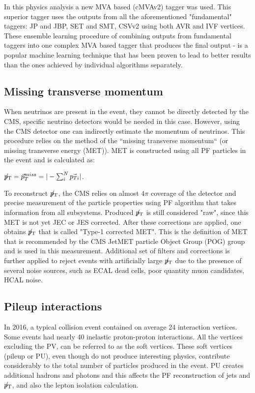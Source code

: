 \begin{small}
In this physics analysis a new MVA based (cMVAv2) tagger was used. This superior tagger uses the outputs from all the aforementioned "fundamental" taggers: JP and JBP, SET and SMT, CSVv2 using both AVR and IVF vertices. These ensemble learning procedure \cite{ensemble_learning} of combining outputs from fundamental taggers into one complex MVA based tagger that produces the final output - is a popular machine learning technique that has been proven to lead to better results than the ones achieved by individual algorithms separately. 

\subsection{Missing transverse momentum}\label{sec:met}

When neutrinos are present in the event, they cannot be directly detected by the CMS, specific neutrino detectors would be needed in this case. However, using the CMS detector one can indirectly estimate the momentum of neutrinos. This procedure relies on the method of the ``missing  transverse momentum`` \PTslash (or missing transverse energy  \ETslash (MET)).  MET is constructed using all PF particles in the event and is calculated as:

${p}_\mathrm{T}\hspace{-1.02em}/\kern 0.5em = \vec{p}^{miss}_T = |- \sum^N_i \vec{p_{Ti}} |$. 

To reconstruct ${p}_\mathrm{T}\hspace{-1.02em}/\kern 0.5em$, the CMS relies on almost $4 \pi$ coverage of the detector and precise measurement of the particle properties using PF algorithm that takes information from all subsystems. Produced ${p}_\mathrm{T}\hspace{-1.02em}/\kern 0.5em$ is still considered "raw", since this MET is not yet JEC or JES corrected. After these corrections are applied, one obtains  ${p}_\mathrm{T}\hspace{-1.02em}/\kern 0.5em$ that is called "Type-1 corrected MET". This is the definition of MET that is recommended by the CMS JetMET particle Object Group (POG) group and is used in this measurement. Additional set of filters and corrections is further applied to reject events with artificially large ${p}_\mathrm{T}\hspace{-1.02em}/\kern 0.5em$ due to the presence of several noise sources, such as ECAL dead cells, poor quantity muon candidates, HCAL noise. 

\subsection{Pileup interactions}\label{sec:pileup}

In 2016, a typical collision event contained on average 24 interaction vertices. Some events had nearly 40 inelastic proton-proton interactions. All the vertices excluding the PV, can be referred to as the soft vertices. These soft vertices (pileup or PU), even though do not produce interesting physics, contribute considerably to the total number of particles produced in the event. PU creates additional hadrons and photons and this affects the PF reconstruction of jets and ${p}_\mathrm{T}\hspace{-1.02em}/\kern 0.5em$, and also the lepton isolation calculation.


\end{small}
